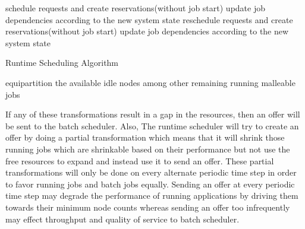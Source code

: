 \clearpage
\setcounter{AlgoLine}{0}
\begin{algorithm}[H]
 \DontPrintSemicolon
 schedule requests and create reservations(without job start)\;
 update job dependencies according to the new system state\;
 reschedule requests and create reservations(without job start)\;
 update job dependencies according to the new system state\;
 \caption{Runtime Scheduling Algorithm}
\end{algorithm}
\pagebreak
\begin{algorithm}[!t]
 \DontPrintSemicolon
 equipartition the available idle nodes among other remaining running malleable jobs\;
\end{algorithm}
If any of these transformations result in a gap in the resources, then an offer will be sent to the batch scheduler. Also, The runtime scheduler will try to create an offer by doing a partial transformation which means that it will shrink those running jobs which are shrinkable based on their performance but not use the free resources to expand and instead use it to send an offer. These partial transformations will only be done on every alternate periodic  time step in order to favor running jobs and batch jobs equally. Sending an offer at every periodic time step may degrade the performance of running applications by driving them towards their minimum node counts whereas sending an offer too infrequently may effect throughput and quality of service to batch scheduler.
